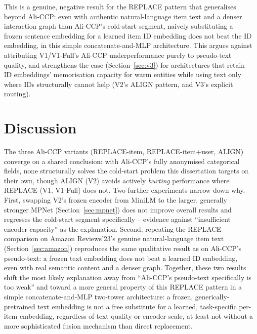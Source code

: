This is a genuine, negative result for the REPLACE pattern that generalises beyond Ali-CCP: even with authentic natural-language item text and a denser interaction graph than Ali-CCP's cold-start segment, naively substituting a frozen sentence embedding for a learned item ID embedding does not beat the ID embedding, in this simple concatenate-and-MLP architecture. This argues against attributing V1/V1-Full's Ali-CCP underperformance purely to pseudo-text quality, and strengthens the case (Section~\ref{sec:v3}) for architectures that retain ID embeddings' memorisation capacity for warm entities while using text only where IDs structurally cannot help (V2's ALIGN pattern, and V3's explicit routing).

\section{Discussion}
\label{sec:discussion}

The three Ali-CCP variants (REPLACE-item, REPLACE-item+user, ALIGN) converge on a shared conclusion: with Ali-CCP's fully anonymised categorical fields, none structurally solves the cold-start problem this dissertation targets on their own, though ALIGN (V2) avoids actively \emph{hurting} performance where REPLACE (V1, V1-Full) does not. Two further experiments narrow down why. First, swapping V2's frozen encoder from MiniLM to the larger, generally stronger MPNet (Section~\ref{sec:mpnet}) does not improve overall results and regresses the cold-start segment specifically -- evidence against ``insufficient encoder capacity'' as the explanation. Second, repeating the REPLACE comparison on Amazon Reviews'23's genuine natural-language item text (Section~\ref{sec:amazon}) reproduces the same qualitative result as on Ali-CCP's pseudo-text: a frozen text embedding does not beat a learned ID embedding, even with real semantic content and a denser graph. Together, these two results shift the most likely explanation away from ``Ali-CCP's pseudo-text specifically is too weak'' and toward a more general property of this REPLACE pattern in a simple concatenate-and-MLP two-tower architecture: a frozen, generically-pretrained text embedding is not a free substitute for a learned, task-specific per-item embedding, regardless of text quality or encoder scale, at least not without a more sophisticated fusion mechanism than direct replacement.

